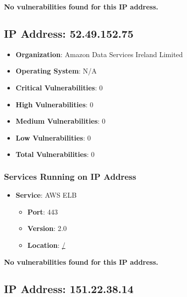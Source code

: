 \documentclass{article}
\begin{document}
\textbf{No vulnerabilities found for this IP address.}




\clearpage



\subsection*{IP Address: 52.49.152.75}

\begin{itemize}
    \item \textbf{Organization}: Amazon Data Services Ireland Limited
    \item \textbf{Operating System}:  N/A 
    \item \textbf{Critical Vulnerabilities}: 0
    \item \textbf{High Vulnerabilities}: 0
    \item \textbf{Medium Vulnerabilities}: 0
    \item \textbf{Low Vulnerabilities}: 0
    \item \textbf{Total Vulnerabilities}: 0
\end{itemize}

\subsubsection*{Services Running on IP Address}

\begin{itemize}
    
        \item \textbf{Service}: AWS ELB
        \begin{itemize}
            \item \textbf{Port}: 443
            \item \textbf{Version}:  2.0 
            \item \textbf{Location}: \href{ / }{ / }
        \end{itemize}
    
\end{itemize}


\textbf{No vulnerabilities found for this IP address.}




\clearpage



\subsection*{IP Address: 151.22.38.14}
\end{document}
